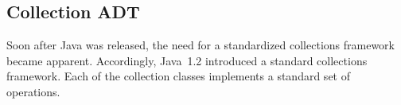 
%
%


\subsection{Collection ADT}

Soon after Java was released, the need for a standardized collections
framework became apparent.  Accordingly, Java~1.2 introduced a
standard collections framework.  Each of the collection classes
implements a standard set of operations.


